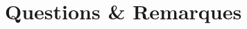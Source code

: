 \documentclass[11pt,a4paper]{article}
\begin{document}











\section{Questions \& Remarques}
\end{document}
